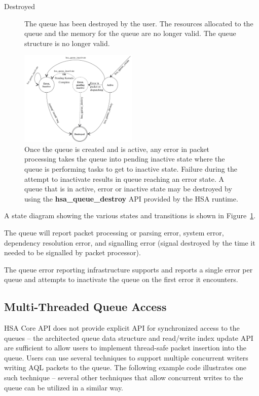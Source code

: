 \documentclass{book}
\newcommand{\reffun}[1]{\textbf{#1}}
\begin{document}
\begin{description}
\item[Destroyed] The queue has been destroyed by the user.  The
resources allocated to the queue and the memory for the queue are no
longer valid. The queue structure is no longer valid.
\end{description}

\begin{figure}
  \centering
  \includegraphics[width=0.5\textwidth] {fig/queuestate}
  \centering
  \caption{Once the queue is created and is active, any error in
          packet processing takes the queue into pending inactive
          state where the queue is performing tasks to get to
          inactive state. Failure during the attempt to inactivate
          results in queue reaching an error state. A queue that is
          in active, error or inactive state may be destroyed by
          using the \reffun{hsa\_queue\_destroy} API provided by
  the HSA runtime.}
  \label{fig:queuestate}
\end{figure}

A state diagram showing the various states and transitions is shown
in Figure~\ref{fig:queuestate}.

The queue will report packet processing or parsing error, system
error, dependency resolution error, and signalling error (signal
destroyed by the time it needed to be signalled by packet processor).

The queue error reporting infrastructure supports and reports a
single error per queue and attempts to inactivate the queue on the
first error it encounters.

\hypertarget{coreapi_multithreading}{}\subsection{Multi-\/\-Threaded
Queue Access}\label{coreapi_multithreading}
HSA Core API does not provide explicit API for synchronized
access to the queues -- the architected queue data structure and
read/write index update API are
sufficient to allow users to implement thread-safe packet insertion
into the queue. Users can use several techniques to support
multiple concurrent writers writing AQL packets to the queue.  The
following example code illustrates one such technique -- several
other techniques that allow concurrent writes to the queue can be
utilized in a similar way.
\end{document}
